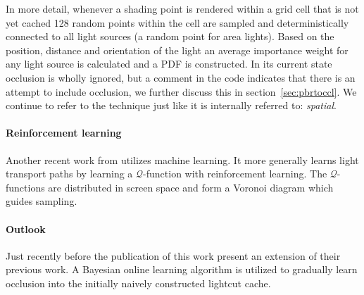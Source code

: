 In more detail, whenever a shading point is rendered within a grid cell that is not yet cached 128 random points within the cell are sampled and deterministically connected to all light sources (a random point for area lights). Based on the position, distance and orientation of the light an average importance weight for any light source is calculated and a PDF is constructed. In its current state occlusion is wholly ignored, but a comment in the code indicates that there is an attempt to include occlusion, we further discuss this in section~\ref{sec:pbrtoccl}. We continue to refer to the technique just like it is internally referred to: \textit{spatial}.

\paragraph{Reinforcement learning}

Another recent work from \parencite{DBLP:journals/corr/DahmK17} utilizes machine learning. It more generally learns light transport paths by learning a $\mathcal{Q}$-function with reinforcement learning. The $\mathcal{Q}$-functions are distributed in screen space and form a Voronoi diagram which guides sampling.

\paragraph{Outlook}

Just recently before the publication of this work \textcite{Vevoda:2018:BOR} present an extension of their previous work. A Bayesian online learning algorithm is utilized to gradually learn occlusion into the initially naively constructed lightcut cache. 